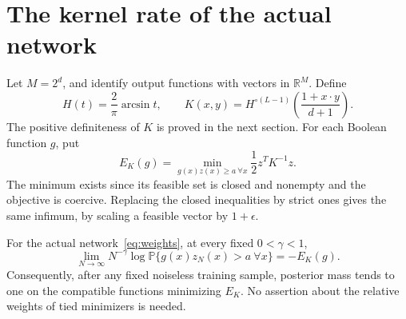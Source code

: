 \section{The kernel rate of the actual network}
Let $M=2^d$, and identify output functions with vectors in $\mathbb R^M$.
Define
\begin{equation}\label{eq:kernel}
 H(t)=\frac2\pi\arcsin t,\qquad
 K(x,y)=H^{\circ(L-1)}\!\left(\frac{1+x\cdot y}{d+1}\right).
\end{equation}
The positive definiteness of $K$ is proved in the next section.
For each Boolean function $g$, put
\begin{equation}\label{eq:energy}
 E_K(g)=\min_{g(x)z(x)\ge a\ \forall x}\frac12 z^TK^{-1}z.
\end{equation}
The minimum exists since its feasible set is closed and nonempty and
the objective is coercive. Replacing the closed inequalities by strict
ones gives the same infimum, by scaling a feasible vector by $1+\epsilon$.

\begin{proposition}
\label{prop:rate}
For the actual network~\eqref{eq:weights}, at every fixed
$0<\gamma<1$,
\begin{equation}\label{eq:rate}
 \lim_{N\to\infty}N^{-\gamma}\log
 \mathbb P\{g(x)z_N(x)>a\ \forall x\}=-E_K(g).
\end{equation}
Consequently, after any fixed noiseless training sample, posterior
mass tends to one on the compatible functions minimizing $E_K$.
No assertion about the relative weights of tied minimizers is needed.
\end{proposition}

